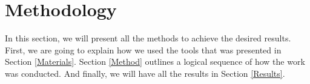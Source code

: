 \section{Methodology}

In this section, we will present all the methods to achieve the desired results. First, we are going to explain how we used the tools that was presented in Section \ref{Materials}. Section \ref{Method} outlines a logical sequence of how the work was conducted. And finally, we will have all the results in Section \ref{Results}.
